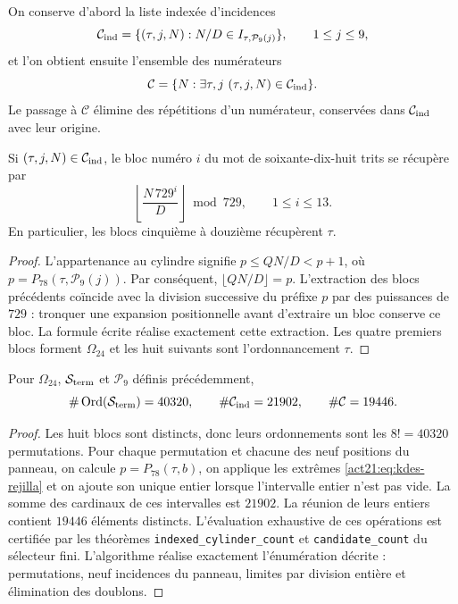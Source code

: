 On conserve d'abord la liste indexée d'incidences
\[
 \mathcal C_{\rm ind}=
 \{(\tau,j,N):N/D\in I_{\tau,\mathcal P_9(j)}\},
 \qquad1\leq j\leq9,
\]
et l'on obtient ensuite l'ensemble des numérateurs
\[
 \mathcal C=\{N:\exists\tau,j\ (\tau,j,N)\in\mathcal C_{\rm ind}\}.
\]
Le passage à $\mathcal C$ élimine des répétitions d'un numérateur, conservées
dans $\mathcal C_{\rm ind}$ avec leur origine.

\begin{lemma}
Si $(\tau,j,N)\in\mathcal C_{\rm ind}$, le bloc numéro $i$ du
mot de soixante-dix-huit trits se récupère par
\[
 \left\lfloor\frac{N\,729^i}{D}\right\rfloor\bmod729,
 \qquad1\leq i\leq13.
\]
En particulier, les blocs cinquième à douzième récupèrent $\tau$.
\end{lemma}
\begin{proof}
L'appartenance au cylindre signifie
$p\leq QN/D<p+1$, où $p=P_{78}(\tau,\mathcal P_9(j))$.
Par conséquent, $\lfloor QN/D\rfloor=p$. L'extraction des blocs
précédents coïncide avec la division successive du préfixe $p$ par
des puissances de $729$ : tronquer une expansion positionnelle avant d'extraire
un bloc conserve ce bloc. La formule écrite réalise
exactement cette extraction. Les quatre premiers blocs forment
$\Omega_{24}$ et les huit suivants sont l'ordonnancement $\tau$.
\end{proof}

\begin{proposition}
Pour $\Omega_{24}$, $\mathcal S_{\rm term}$ et $\mathcal P_9$
définis précédemment,
\[
 \#\operatorname{Ord}(\mathcal S_{\rm term})=40320,
 \qquad\#\mathcal C_{\rm ind}=21902,
 \qquad\#\mathcal C=19446.
\]
\end{proposition}
\begin{proof}
Les huit blocs sont distincts, donc leurs ordonnements sont les
$8!=40320$ permutations. Pour chaque permutation et chacune des
neuf positions du panneau, on calcule $p=P_{78}(\tau,b)$, on applique
les extrêmes \eqref{act21:eq:kdes-rejilla} et on ajoute son unique entier lorsque
l'intervalle entier n'est pas vide. La somme des cardinaux de ces
intervalles est $21902$. La réunion de leurs entiers contient $19446$
éléments distincts. L'évaluation exhaustive de ces opérations
est certifiée par les théorèmes
\texttt{indexed\_cylinder\_count} et \texttt{candidate\_count} du
sélecteur fini. L'algorithme réalise exactement l'énumération
décrite : permutations, neuf incidences du panneau, limites par
division entière et élimination des doublons.
\end{proof}

